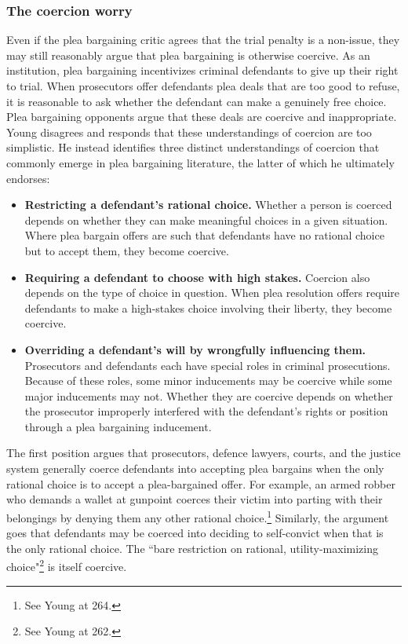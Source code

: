 \subsubsection{The coercion worry}

Even if the plea bargaining critic agrees that the trial penalty is a non-issue, they may still reasonably argue that plea bargaining is otherwise coercive. As an institution, plea bargaining incentivizes criminal defendants to give up their right to trial. When prosecutors offer defendants plea deals that are too good to refuse, it is reasonable to ask whether the defendant can make a genuinely free choice. Plea bargaining opponents argue that these deals are coercive and inappropriate. Young disagrees and responds that these understandings of coercion are too simplistic. He instead identifies three distinct understandings of coercion that commonly emerge in plea bargaining literature, the latter of which he ultimately endorses:

\begin{itemize}
    \item \textbf{Restricting a defendant's rational choice.} Whether a person is coerced depends on whether they can make meaningful choices in a given situation. Where plea bargain offers are such that defendants have no rational choice but to accept them, they become coercive.
    \item \textbf{Requiring a defendant to choose with high stakes.} Coercion also depends on the type of choice in question. When plea resolution offers require defendants to make a high-stakes choice involving their liberty, they become coercive.
    \item \textbf{Overriding a defendant's will by wrongfully influencing them.} Prosecutors and defendants each have special roles in criminal prosecutions. Because of these roles, some minor inducements may be coercive while some major inducements may not. Whether they are coercive depends on whether the prosecutor improperly interfered with the defendant's rights or position through a plea bargaining inducement.
\end{itemize}

The first position argues that prosecutors, defence lawyers, courts, and the justice system generally coerce defendants into accepting plea bargains when the only rational choice is to accept a plea-bargained offer. For example, an armed robber who demands a wallet at gunpoint coerces their victim into parting with their belongings by denying them any other rational choice.\footnote{See Young at 264.} Similarly, the argument goes that defendants may be coerced into deciding to self-convict when that is the only rational choice. The ``bare restriction on rational, utility-maximizing choice"\footnote{See Young at 262.} is itself coercive. 

